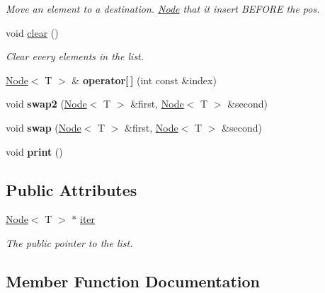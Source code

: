 \begin{DoxyCompactItemize}
\begin{DoxyCompactList}\small\item\em Move an element to a destination. \hyperlink{structNode}{Node} that it insert B\+E\+F\+O\+RE the pos. \end{DoxyCompactList}\item 
void \hyperlink{classList_ae296516a252e11963dbf963727ce429a}{clear} ()
\begin{DoxyCompactList}\small\item\em Clear every elements in the list. \end{DoxyCompactList}\item 
\mbox{\label{classList_a8112bcf1ec3cbbc681dd54073d299c03}} 
\hyperlink{structNode}{Node}$<$ T $>$ \& {\bfseries operator\mbox{[}$\,$\mbox{]}} (int const \&index)
\item 
\mbox{\label{classList_a8fb146e3a7ae88e7634065e57464c484}} 
void {\bfseries swap2} (\hyperlink{structNode}{Node}$<$ T $>$ \&first, \hyperlink{structNode}{Node}$<$ T $>$ \&second)
\item 
\mbox{\label{classList_a05c720c443e157c341c810decc9d9e01}} 
void {\bfseries swap} (\hyperlink{structNode}{Node}$<$ T $>$ \&first, \hyperlink{structNode}{Node}$<$ T $>$ \&second)
\item 
\mbox{\label{classList_a67760ff5954e207fc9aa8d537675b8a0}} 
void {\bfseries print} ()
\end{DoxyCompactItemize}
\subsection*{Public Attributes}
\begin{DoxyCompactItemize}
\item 
\hyperlink{structNode}{Node}$<$ T $>$ $\ast$ \hyperlink{classList_a36398f758397060735c8df9f7d11235d}{iter}
\begin{DoxyCompactList}\small\item\em The public pointer to the list. \end{DoxyCompactList}\end{DoxyCompactItemize}


\subsection{Member Function Documentation}
\mbox{\label{classList_a0e0849a1ca10791cb2788ec41af14c26}} 
